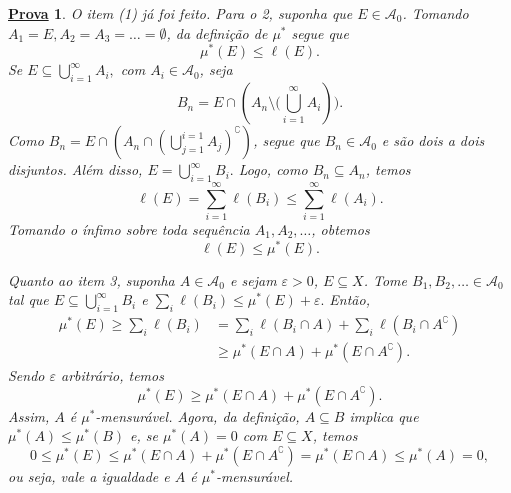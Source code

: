 \documentclass{article}
\newtheorem*{proof*}{\underline{Prova}}
\begin{document}
\begin{proof*}
  O item (1) já foi feito. Para o 2, suponha que \(E\in \mathcal{A}_{0}\). Tomando \(A_1 = E, A_2 = A_3 = \dotsc = \emptyset \), da definição de \(\mu ^{*}\) segue que 
    \[
      \mu ^{*}(E) \leq \ell (E).
    \]
    Se \(E\subseteq \bigcup_{i=1}^{\infty}A_{i},\) com \(A_{i}\in \mathcal{A}_{0}\), seja 
      \[
        B_{n} = E\cap (A_{n}\setminus{(\bigcup_{i=1}^{\infty}A_{i}})).
      \]
    Como \(B_{n} = E\cap (A_{n}\cap (\bigcup_{j=1}^{i=1}A_{j})^{\complement})\), segue que \(B_{n}\in \mathcal{A}_{0}\) e são dois a dois disjuntos. Além disso, \(E = \bigcup_{i=1}^{\infty}B_{i}.\) Logo, 
  como \(B_{n}\subseteq A_{n}\), temos 
    \[
      \ell (E) = \sum\limits_{i=1}^{\infty}\ell (B_{i}) \leq \sum\limits_{i=1}^{\infty}\ell (A_{i}).
    \]
    Tomando o ínfimo sobre toda sequência \(A_1, A_2, \dotsc \), obtemos 
      \[
        \ell (E) \leq \mu ^{*}(E).
      \]

  Quanto ao item 3, suponha \(A\in \mathcal{A}_{0}\) e sejam \(\varepsilon > 0\), \(E\subseteq X\). Tome \(B_1, B_2, \dotsc \in \mathcal{A}_{0}\) tal que \(E\subseteq \bigcup_{i=1}^{\infty}B_{i}\) e \(\sum\limits_{i}^{}\ell (B_{i}) \leq \mu ^{*}(E) + \varepsilon .\) Então, 
 \begin{align*}
   \mu ^{*}(E) \geq \sum\limits_{i}^{}\ell (B_{i}) &= \sum\limits_{i}^{}\ell (B_{i}\cap A) + \sum\limits_{i}^{}\ell (B_{i}\cap A ^{\complement})\\
                                                   &\geq \mu ^{*}(E\cap A) + \mu ^{*}(E\cap A ^{\complement}).
 \end{align*}
 Sendo \(\varepsilon \) arbitrário, temos 
   \[
     \mu^{*}(E) \geq \mu ^{*}(E\cap A) + \mu ^{*}(E\cap A ^{\complement}).
   \] 
   Assim, \(A\) é \(\mu ^{*}\)-mensurável. Agora, da definição, \(A\subseteq B\) implica que \(\mu ^{*}(A) \leq \mu ^{*}(B)\) e, se \(\mu ^{*}(A) = 0\) com \(E\subseteq X\), 
  temos 
    \[
      0 \leq \mu ^{*}(E) \leq \mu ^{*}(E\cap A) + \mu ^{*}(E\cap A ^{\complement}) = \mu ^{*}(E\cap A) \leq \mu ^{*}(A) = 0,
    \]
    ou seja, vale a igualdade e \(A\) é \(\mu ^{*}\)-mensurável.


\end{proof*}
\end{document}
